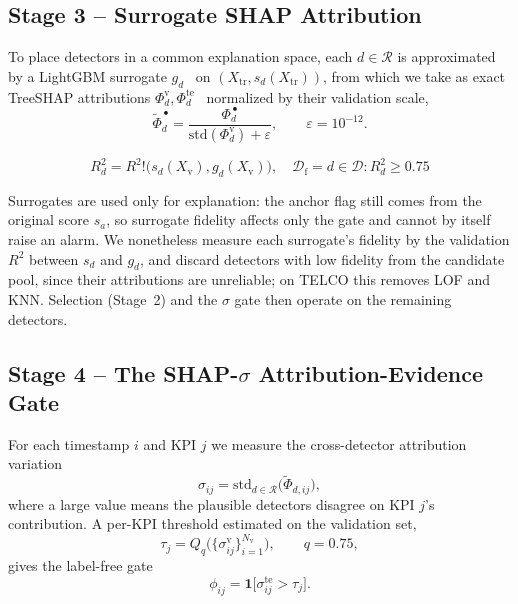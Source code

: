 \documentclass[conference]{IEEEtran}
\begin{document}
\subsection{Stage 3 -- Surrogate SHAP Attribution}
\label{sec:shap}
To place detectors in a common explanation space, each
$d\in\mathcal{R}$ is approximated by a LightGBM surrogate
$g_d$~\cite{Ke2017} on $(X_{\mathrm{tr}},s_d(X_{\mathrm{tr}}))$, from
which we take as exact TreeSHAP attributions
$\Phi_d^{\mathrm{v}},\Phi_d^{\mathrm{te}}$~\cite{Lundberg2017,Lundberg2020}
normalized by their validation scale,
\begin{equation}
\tilde{\Phi}_d^{\,\bullet}=\frac{\Phi_d^{\,\bullet}}{\mathrm{std}(\Phi_d^{\mathrm{v}})+\varepsilon},\qquad \varepsilon=10^{-12}.
\label{eq:shap-normalization}
\end{equation}

$$R^2_d=R^2!\bigl(s_d(X_{\mathrm{v}}),g_d(X_{\mathrm{v}})\bigr),\quad \mathcal{D}_{\mathrm{f}}={d\in\mathcal{D}: R^2_d\ge 0.75}$$
  
Surrogates are used only for explanation: the anchor flag still comes
from the original score $s_a$, so surrogate fidelity affects only the
gate and cannot by itself raise an alarm. We nonetheless measure each
surrogate's fidelity by the validation $R^2$ between $s_d$ and $g_d$, and
discard detectors with low fidelity from the
candidate pool, since their attributions are unreliable; on TELCO this
removes LOF and KNN. Selection (Stage~2) and the $\sigma$ gate then
operate on the remaining detectors.

\subsection{Stage 4 -- The SHAP-$\sigma$ Attribution-Evidence Gate}
\label{sec:sigma}
For each timestamp $i$ and KPI $j$ we measure the cross-detector
attribution variation
\begin{equation}
\sigma_{ij}=\mathrm{std}_{d\in\mathcal{R}}\bigl(\tilde{\Phi}_{d,ij}\bigr),
\label{eq:sigma}
\end{equation}
where a large value means the plausible detectors disagree on KPI $j$'s
contribution. A per-KPI threshold estimated on the validation set,
\begin{equation}
\tau_j=Q_q\bigl(\{\sigma^{\mathrm{v}}_{ij}\}_{i=1}^{N_{\mathrm{v}}}\bigr),\qquad q=0.75,
\label{eq:tau}
\end{equation}
gives the label-free gate
\begin{equation}
\phi_{ij}=\mathbf{1}\bigl[\sigma^{\mathrm{te}}_{ij}>\tau_j\bigr].
\label{eq:gate}
\end{equation}
\end{document}
